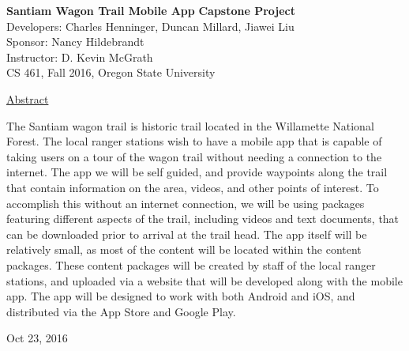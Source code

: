 \documentclass[letterpaper,10pt,titlepage]{article}
\begin{document}
\begin{titlepage}
\begin{center}
    \Huge
    \textbf{Santiam Wagon Trail Mobile App}
    \textbf{Capstone Project}\\
    \vspace{1.0cm}
    \large
    Developers: Charles Henninger, Duncan Millard, Jiawei Liu\\
    Sponsor: Nancy Hildebrandt\\
    \vspace{1.5cm}
    \large
    Instructor: D. Kevin McGrath\\

    \large
    CS 461, Fall 2016, Oregon State University\\
    
    \vspace{0.5cm}

    \vspace{2.5cm}
    \large
    \underline{Abstract}\\
    \vspace{0.3cm}
    \end{center}
    \large
    
    The Santiam wagon trail is historic trail located in the Willamette National Forest. The local ranger stations wish to have a mobile app that is capable of taking users on a tour of the wagon trail without needing a connection to the internet. The app we will be self guided, and provide waypoints along the trail that contain information on the area, videos, and other points of interest. To accomplish this without an internet connection, we will be using packages featuring different aspects of the trail, including videos and text documents, that can be downloaded prior to arrival at the trail head. The app itself will be relatively small, as most of the content will be located within the content packages.  These content packages will be created by staff of the local ranger stations, and uploaded via a website that will be developed along with the mobile app. The app will be designed to work with both Android and iOS, and distributed via the App Store and Google Play.


    
    \vspace{0.8cm}
    \vfill
    
\begin{center}    
    Oct 23, 2016

\end{center}
\end{titlepage}
\end{document}
